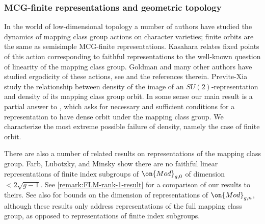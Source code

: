 \documentclass[12 pt]{amsart}
\theoremstyle{plain}
\theoremstyle{definition}
\theoremstyle{remark}
\numberwithin{equation}{section}
\begin{document}
\subsubsection{MCG-finite representations and geometric topology}

In the world of low-dimensional topology a number of authors have studied the
dynamics of mapping class group actions on character varieties; finite orbits
are the same as semisimple MCG-finite representations. Kasahara
\cite{kasahara2015visualization} relates fixed points of this action
corresponding to faithful representations to the well-known question of
linearity of the mapping class group. Goldman and many other authors have
studied ergodicity of these actions, see \cite{goldmanmapping} and the
references therein. Previte-Xia \cite{previte2000topological,
previte2002topological} study the relationship between density of the image of
an $SU(2)$-representation and density of its mapping class group orbit. In some
sense our main result is a partial answer to \cite[Question
2.7]{goldmanmapping}, which asks for necessary and sufficient conditions for a
representation to have dense orbit under the mapping class group. We
characterize the most extreme possible failure of density, namely the case of
finite orbit.

There are also a number of related results on representations of the mapping class group.
Farb, Lubotzky, and Minsky \cite[Theorem 1.6]{farbLM:rank-1-phenomena} show there are no faithful linear
representations of finite index subgroups of $\on{Mod}_{g,0}$ of dimension $< 2 \sqrt{g-1}$. See \autoref{remark:FLM-rank-1-result} for a comparison of our results to theirs.
See also
\cite{franksH:triviality,korkmaz:low-dimensional-linear-representations,funar:two-questions, kielak-pierro}
for bounds on the dimension of representations of 
$\on{Mod}_{g,n}$, although these results only address representations of the full mapping
class group, as opposed to representations of finite index subgroups.
\end{document}
